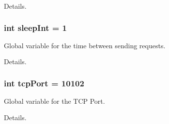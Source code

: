 Details. 
\subsubsection[{\texorpdfstring{sleep\+Int}{sleepInt}}]{\setlength{\rightskip}{0pt plus 5cm}int sleep\+Int = 1}\hypertarget{simple-iec61850-client_8c_a7c0b25939579bd308b11966fb04288e0}{}\label{simple-iec61850-client_8c_a7c0b25939579bd308b11966fb04288e0}


Global variable for the time between sending requests. 

Details. 
\subsubsection[{\texorpdfstring{tcp\+Port}{tcpPort}}]{\setlength{\rightskip}{0pt plus 5cm}int tcp\+Port = 10102}\hypertarget{simple-iec61850-client_8c_ac31354d08316076b496efb2b3a2c69e6}{}\label{simple-iec61850-client_8c_ac31354d08316076b496efb2b3a2c69e6}


Global variable for the T\+CP Port. 

Details. 